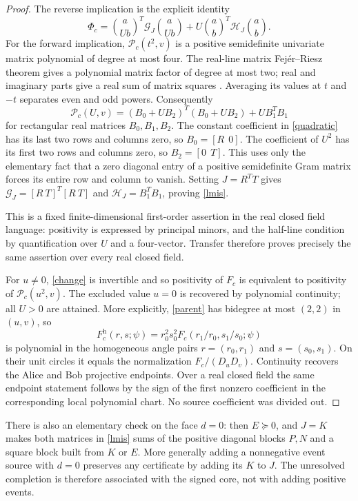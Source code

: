 \documentclass[11pt]{article}
\newcommand{\PSD}{\succeq0}
\begin{document}
\begin{proof}
The reverse implication is the explicit identity
\begin{equation}
\Phi_c=
\binom a{Ub}^{\!T}\mathcal G_J\binom a{Ub}
+U\binom ab^{\!T}\mathcal H_J\binom ab.\label{split}
\end{equation}
For the forward implication, $\mathcal P_c(t^2,v)$ is a positive semidefinite
univariate matrix polynomial of degree at most four.  The real-line matrix
Fej\'er--Riesz theorem gives a polynomial matrix factor of degree at most two;
real and imaginary parts give a real sum of matrix squares
\cite[Theorem 1.2]{Zalar}. Averaging its values at $t$ and $-t$ separates even
and odd powers. Consequently
\[
\mathcal P_c(U,v)=(B_0+UB_2)^T(B_0+UB_2)+UB_1^TB_1
\]
for rectangular real matrices $B_0,B_1,B_2$.
The constant coefficient in \eqref{quadratic} has its last two rows and columns
zero, so $B_0=[R\ \ 0]$.  The coefficient of $U^2$ has its first two rows and
columns zero, so $B_2=[0\ \ T]$.  This uses only the elementary fact that a
zero diagonal entry of a positive semidefinite Gram matrix forces its entire
row and column to vanish.  Setting $J=R^TT$ gives
$\mathcal G_J=[R\ T]^T[R\ T]$ and
$\mathcal H_J=B_1^TB_1$, proving \eqref{lmis}.

This is a fixed finite-dimensional first-order assertion in the real closed
field language: positivity is expressed by principal minors, and the
half-line condition by quantification over $U$ and a four-vector.  Transfer
therefore proves precisely the same assertion over every real closed field.

For $u\ne0$, \eqref{change} is invertible and so positivity of $F_c$ is equivalent
to positivity of $\mathcal P_c(u^2,v)$.  The excluded value $u=0$ is recovered
by polynomial continuity; all $U>0$ are attained.  More explicitly,
\eqref{parent} has bidegree at most $(2,2)$ in $(u,v)$, so
\[
F_c^{\mathrm h}(r,s;\psi)
=r_0^2s_0^2F_c(r_1/r_0,s_1/s_0;\psi)
\]
is polynomial in the homogeneous angle pairs $r=(r_0,r_1)$ and
$s=(s_0,s_1)$.  On their unit circles it equals the normalization
$F_c/(D_uD_v)$.  Continuity recovers the Alice and Bob projective endpoints.
Over a real closed field the same endpoint statement follows by the sign of
the first nonzero coefficient in the corresponding local polynomial chart.
No source coefficient was divided out.
\end{proof}

There is also an elementary check on the face $d=0$: then $E\PSD$, and
$J=K$ makes both matrices in \eqref{lmis} sums of the positive diagonal blocks
$P,N$ and a square block built from $K$ or $E$. More generally adding a
nonnegative event source with $d=0$ preserves any certificate by adding its
$K$ to $J$.  The unresolved completion is therefore associated with the signed
core, not with adding positive events.
\end{document}
